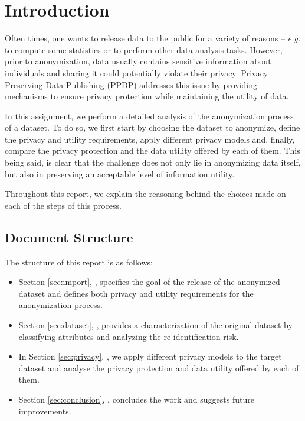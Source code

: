 \documentclass[a4paper, 11pt]{article}
\begin{document}
\pagebreak

\tableofcontents \pagebreak
\listoffigures \pagebreak
\listoftables
\lstlistoflistings \pagebreak


\printnomenclature

\pagebreak


\section{Introduction}

Often times, one wants to release data to the public for a variety of reasons -- \textit{e.g.}
to compute some statistics or to perform other data analysis tasks. However,
prior to anonymization, data usually contains sensitive information about
individuals and sharing it could potentially violate their privacy. Privacy
Preserving Data Publishing (PPDP) addresses this issue by providing mechanisms
to ensure privacy protection while maintaining the utility of data.

In this assignment, we perform a detailed analysis of the anonymization process 
of a dataset. To do so, we first start by choosing the dataset to anonymize, 
define the privacy and utility requirements, apply different privacy models 
and, finally, compare the privacy protection and the data utility offered by 
each of them. This being said, is clear that the  challenge does not only lie 
in anonymizing data itself, but also in preserving an acceptable level of 
information utility.

Throughout this report, we explain the reasoning behind the choices made on 
each of the steps of this process.

\subsection*{Document Structure}

The structure of this report is as follows:

\begin{itemize}
    \item Section \ref{sec:import}, \textbf{}, specifies the
    goal of the release of the anonymized dataset and defines both privacy and 
    utility requirements for the anonymization process.
    \item Section \ref{sec:dataset}, \textbf{}, provides a 
    characterization of the original dataset by classifying attributes and 
    analyzing the re-identification risk.
    \item In Section \ref{sec:privacy}, \textbf{}, we 
    apply different privacy models to the target dataset and analyse the privacy 
    protection and data utility offered by each of them.   
    \item Section \ref{sec:conclusion}, \textbf{}, 
    concludes the work and suggests future improvements.
\end{itemize}
\end{document}
